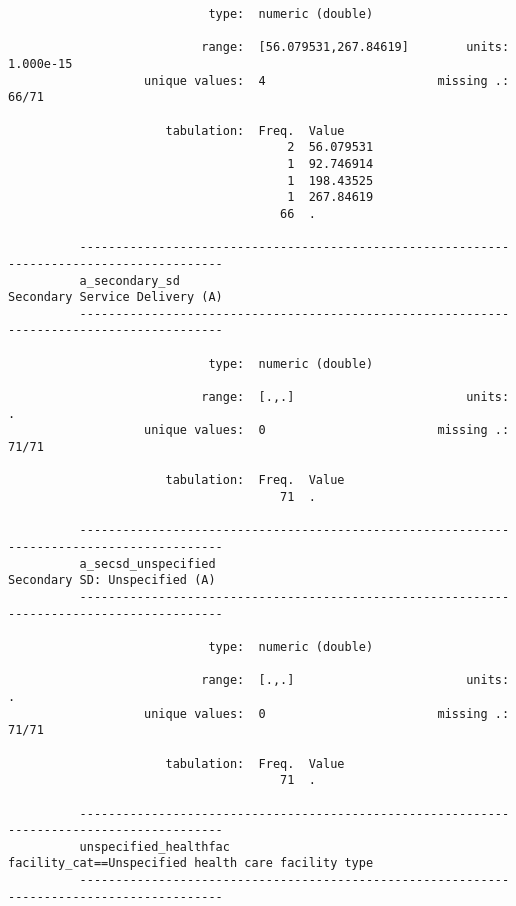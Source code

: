 \documentclass{article}
\begin{document}
\begin{verbatim}
                            type:  numeric (double)
          
                           range:  [56.079531,267.84619]        units:  1.000e-15
                   unique values:  4                        missing .:  66/71
          
                      tabulation:  Freq.  Value
                                       2  56.079531
                                       1  92.746914
                                       1  198.43525
                                       1  267.84619
                                      66  .
          
          ------------------------------------------------------------------------------------------
          a_secondary_sd                                              Secondary Service Delivery (A)
          ------------------------------------------------------------------------------------------
          
                            type:  numeric (double)
          
                           range:  [.,.]                        units:  .
                   unique values:  0                        missing .:  71/71
          
                      tabulation:  Freq.  Value
                                      71  .
          
          ------------------------------------------------------------------------------------------
          a_secsd_unspecified                                          Secondary SD: Unspecified (A)
          ------------------------------------------------------------------------------------------
          
                            type:  numeric (double)
          
                           range:  [.,.]                        units:  .
                   unique values:  0                        missing .:  71/71
          
                      tabulation:  Freq.  Value
                                      71  .
          
          ------------------------------------------------------------------------------------------
          unspecified_healthfac                  facility_cat==Unspecified health care facility type
          ------------------------------------------------------------------------------------------
          

\end{verbatim}
\end{document}
